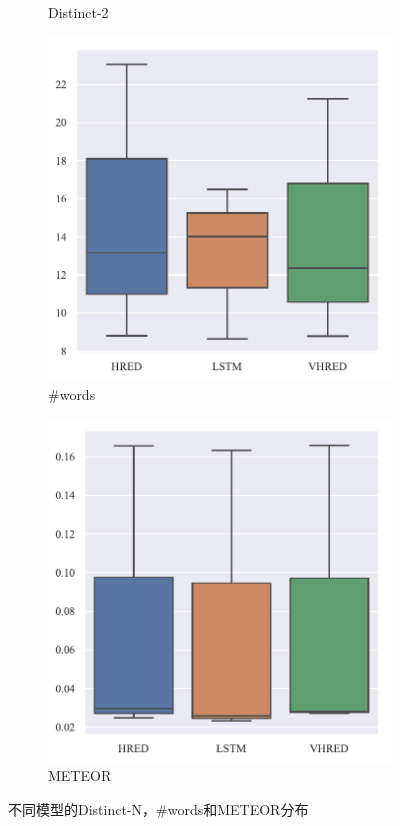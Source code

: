 \begin{figure}[H]
\begin{subfigure}{0.25\linewidth}
        \caption{Distinct-2}
    \end{subfigure}%
    \begin{subfigure}{0.25\linewidth}
        \centering
        \includegraphics[width=\linewidth]{figure/boxplot/model/utterance_len/plot.pdf}
        \caption{\#words}
    \end{subfigure}%
    \begin{subfigure}{0.25\linewidth}
        \centering
        \includegraphics[width=\linewidth]{figure/boxplot/model/meteor/plot.pdf}
        \caption{METEOR}
    \end{subfigure}
    \caption{不同模型的Distinct-N，\#words和METEOR分布}
    \label{fig:Other_model}
\end{figure}
